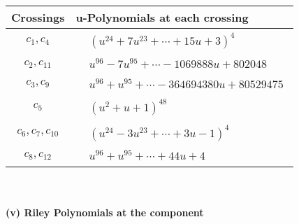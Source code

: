 \documentclass[1p]{elsarticle_modified}
\theoremstyle{definition}
\begin{document}
\begin{tabular}{m{50pt}|m{274pt}}
Crossings & \hspace{64pt}u-Polynomials at each crossing \\
\hline $$\begin{aligned}c_{1},c_{4}\end{aligned}$$&$\begin{aligned}
&(u^{24}+7 u^{23}+\cdots+15 u+3)^{4}
\end{aligned}$\\
\hline $$\begin{aligned}c_{2},c_{11}\end{aligned}$$&$\begin{aligned}
&u^{96}-7 u^{95}+\cdots-1069888 u+802048
\end{aligned}$\\
\hline $$\begin{aligned}c_{3},c_{9}\end{aligned}$$&$\begin{aligned}
&u^{96}+u^{95}+\cdots-364694380 u+80529475
\end{aligned}$\\
\hline $$\begin{aligned}c_{5}\end{aligned}$$&$\begin{aligned}
&(u^2+u+1)^{48}
\end{aligned}$\\
\hline $$\begin{aligned}c_{6},c_{7},c_{10}\end{aligned}$$&$\begin{aligned}
&(u^{24}-3 u^{23}+\cdots+3 u-1)^{4}
\end{aligned}$\\
\hline $$\begin{aligned}c_{8},c_{12}\end{aligned}$$&$\begin{aligned}
&u^{96}+u^{95}+\cdots+44 u+4
\end{aligned}$\\
\hline
\end{tabular}\\~\\
\newpage\renewcommand{\arraystretch}{1}
\flushleft \textbf{(v) Riley Polynomials at the component}\newline \\
\end{document}
